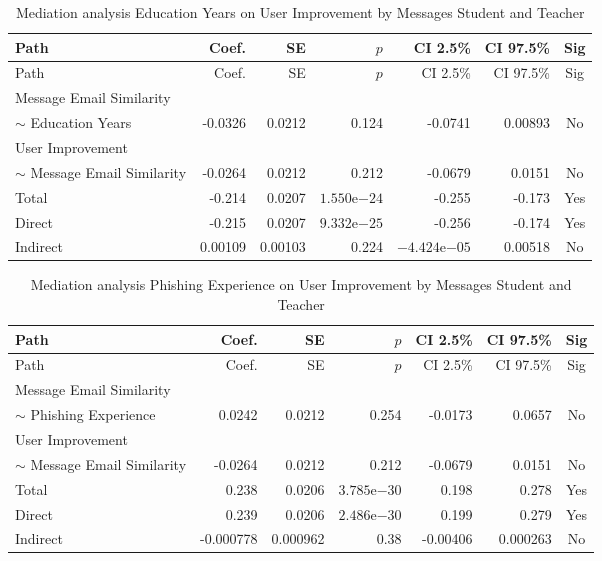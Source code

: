 \begin{longtable}{lrrrrrc}
            \caption{Mediation analysis Education Years on User Improvement by  Messages Student and Teacher}\label{tab:mediation Education Years on User Improvement by  Messages Student and Teacher}\\
            \toprule
            Path & Coef. & SE & $p$ & CI 2.5\% & CI 97.5\% & Sig \\
            \midrule
            \endfirsthead
            \toprule
            Path & Coef. & SE & $p$ & CI 2.5\% & CI 97.5\% & Sig \\
            \midrule
            \endhead
            \bottomrule
            \endfoot
            Message Email Similarity\\ $\sim$ Education Years & -0.0326 & 0.0212 & 0.124 & -0.0741 & 0.00893 & No \\
User Improvement\\ $\sim$ Message Email Similarity & -0.0264 & 0.0212 & 0.212 & -0.0679 & 0.0151 & No \\
Total & -0.214 & 0.0207 & $1.550\mathrm{e}{-24}$ & -0.255 & -0.173 & Yes \\
Direct & -0.215 & 0.0207 & $9.332\mathrm{e}{-25}$ & -0.256 & -0.174 & Yes \\
Indirect & 0.00109 & 0.00103 & 0.224 & $-4.424\mathrm{e}{-05}$ & 0.00518 & No \\
\end{longtable}

\begin{longtable}{lrrrrrc}
            \caption{Mediation analysis Phishing Experience on User Improvement by  Messages Student and Teacher}\label{tab:mediation Phishing Experience on User Improvement by  Messages Student and Teacher}\\
            \toprule
            Path & Coef. & SE & $p$ & CI 2.5\% & CI 97.5\% & Sig \\
            \midrule
            \endfirsthead
            \toprule
            Path & Coef. & SE & $p$ & CI 2.5\% & CI 97.5\% & Sig \\
            \midrule
            \endhead
            \bottomrule
            \endfoot
            Message Email Similarity\\ $\sim$ Phishing Experience & 0.0242 & 0.0212 & 0.254 & -0.0173 & 0.0657 & No \\
User Improvement\\ $\sim$ Message Email Similarity & -0.0264 & 0.0212 & 0.212 & -0.0679 & 0.0151 & No \\
Total & 0.238 & 0.0206 & $3.785\mathrm{e}{-30}$ & 0.198 & 0.278 & Yes \\
Direct & 0.239 & 0.0206 & $2.486\mathrm{e}{-30}$ & 0.199 & 0.279 & Yes \\
Indirect & -0.000778 & 0.000962 & 0.38 & -0.00406 & 0.000263 & No \\
\end{longtable}

